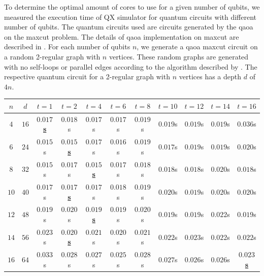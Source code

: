 To determine the optimal amount of cores to use for a given number of qubits, we measured the execution time of QX simulator for quantum circuits with different number of qubits.
The quantum circuits used are circuits generated by the \gls{qaoa} on the \gls{maxcut} problem.
The details of \gls{qaoa} implementation on \gls{maxcut} are described in .
For each number of qubits $n$, we generate a \gls{qaoa} \gls{maxcut} circuit on a random 2-regular graph with $n$ vertices.
These random graphs are generated with no self-loops or parallel edges according to the algorithm described by \textcite{steger1999generating}.
The respective quantum circuit for a 2-regular graph with $n$ vertices has a depth $d$ of $4n$.

\begin{table}[ht]
    \centering
    \begin{adjustwidth}{-0.35cm}{-0.35cm}
    {\renewcommand{\arraystretch}{1.1}
        \setlength{\tabcolsep}{3.55pt}
        \small
        \begin{tabular}{ccccccccccc}
            $n$ & $d$ & $t = 1$ & $t = 2$ & $t = 4$ & $t = 6$ & $t = 8$ & $t = 10$ & $t = 12$ & $t = 14$ & $t = 16$ \\
            \hline
            $4$ & $16$ & \underline{$\mathbf{0.017}$\textbf{s}} & $0.018$s & $0.017$s & $0.017$s & $0.019$s & $0.019$s & $0.019$s & $0.019$s & $0.036$s \\
            $6$ & $24$ & $0.015$s & \underline{$\mathbf{0.015}$\textbf{s}} & $0.017$s & $0.016$s & $0.019$s & $0.017$s & $0.019$s & $0.019$s & $0.020$s \\
            $8$ & $32$ & $0.015$s & $0.017$s & \underline{$\mathbf{0.015}$\textbf{s}} & $0.017$s & $0.018$s & $0.018$s & $0.018$s & $0.020$s & $0.018$s \\
            $10$ & $40$ & $0.017$s & \underline{$\mathbf{0.017}$\textbf{s}} & $0.017$s & $0.018$s & $0.019$s & $0.020$s & $0.019$s & $0.020$s & $0.020$s \\
            $12$ & $48$ & $0.019$s & $0.020$s & \underline{$\mathbf{0.019}$\textbf{s}} & $0.019$s & $0.020$s & $0.019$s & $0.019$s & $0.022$s & $0.019$s \\
            $14$ & $56$ & $0.023$s & \underline{$\mathbf{0.020}$\textbf{s}} & $0.021$s & $0.020$s & $0.021$s & $0.022$s & $0.023$s & $0.022$s & $0.022$s \\
            $16$ & $64$ & $0.033$s & $0.028$s & $0.027$s & $0.025$s & $0.028$s & $0.027$s & $0.026$s & $0.026$s & \underline{$\mathbf{0.023}$\textbf{s}} \\

\end{tabular}}
\end{adjustwidth}
\end{table}
